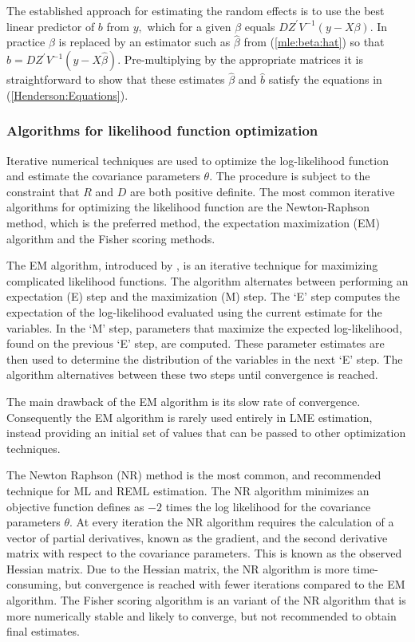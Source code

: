 \documentclass[MAIN.tex]{subfiles}
\begin{document}
The established approach for estimating the random effects is to use the best linear predictor of $b$ from $y,$ which for a given $\beta$ equals $DZ^\prime V^{-1}(y - X \beta).$ In practice $\beta$ is replaced by an estimator such as $\hat{\beta}$ from (\ref{mle:beta:hat}) so that $\hat{b} = DZ^\prime V^{-1}(y - X \hat{\beta}).$ Pre-multiplying by the appropriate matrices it is straightforward to show that these estimates $\hat{\beta}$ and $\hat{b}$ satisfy the equations in (\ref{Henderson:Equations}).

\subsubsection{Algorithms for likelihood function optimization}Iterative numerical techniques are used to optimize the log-likelihood function and estimate the covariance parameters $\theta$. The procedure is subject to the constraint that $R$ and $D$ are both positive definite. The most common iterative algorithms for optimizing the likelihood function are the Newton-Raphson method, which is the preferred method, the expectation maximization (EM) algorithm and the Fisher scoring methods.

The EM algorithm, introduced by \citet{EM}, is an iterative technique for maximizing complicated likelihood functions. The algorithm alternates between performing an expectation (E) step
and the maximization (M) step. The `E' step computes the expectation of the log-likelihood evaluated using the current
estimate for the variables. In the `M' step, parameters that maximize the expected log-likelihood, found on the previous `E' step, are computed. These parameter estimates are then used to determine the distribution of the variables in the next `E' step. The algorithm alternatives between these two steps until convergence is reached.

The main drawback of the EM algorithm is its slow rate of
convergence. Consequently the EM algorithm is rarely used entirely in LME estimation,
instead providing an initial set of values that can be passed to
other optimization techniques.

The Newton Raphson (NR) method is the most common, and recommended technique for ML and
REML estimation. The NR algorithm minimizes an objective function defines as $-2$ times the log likelihood for the covariance parameters $\theta$. At every iteration the NR algorithm requires the
calculation of a vector of partial derivatives, known as the gradient, and the second derivative matrix with respect to the covariance parameters. This is known as the observed Hessian matrix. Due to the Hessian matrix, the NR algorithm is more time-consuming, but convergence is reached with fewer iterations compared to the EM algorithm. The Fisher scoring algorithm is an variant of the NR algorithm that is more numerically stable and likely to converge, but not recommended to obtain final estimates.
\end{document}
